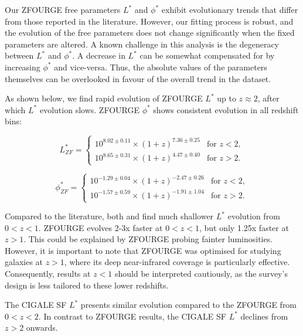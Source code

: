 Our ZFOURGE free parameters $L^{*}$ and $\phi^{*}$ exhibit evolutionary trends that differ from those reported in the literature. However, our fitting process is robust, and the evolution of the free parameters does not change significantly when the fixed parameters are altered. A known challenge in this analysis is the degeneracy between $L^{*}$ and $\phi^{*}$. A decrease in $L^{*}$ can be somewhat compensated for by increasing $\phi^{*}$ and vice-versa. Thus, the absolute values of the parameters themselves can be overlooked in favour of the overall trend in the dataset. 

As shown below, we find rapid evolution of ZFOURGE $L^{*}$ up to $z\approx2$, after which $L^{*}$ evolution slows. ZFOURGE $\phi^{*}$ shows consistent evolution in all redshift bins: 

\begin{equation*}
    L^{*}_{ZF} =
    \begin{cases} 
        10^{8.02 \pm 0.11} \times (1+z)^{7.36 \pm 0.25} & \text{for } z < 2, \\
        10^{8.65 \pm 0.31} \times (1+z)^{4.47 \pm 0.40} & \text{for } z > 2.
    \end{cases}
\end{equation*}

\begin{equation*}
    \phi^{*}_{ZF} =
    \begin{cases} 
        10^{-1.29 \pm 0.04} \times (1+z)^{-2.47 \pm 0.26} & \text{for } z < 2, \\
        10^{-1.57 \pm 0.59} \times (1+z)^{-1.91 \pm 1.04} & \text{for } z > 2.
    \end{cases}
\end{equation*}

Compared to the literature, both \cite{gruppioni_herschel_2013} and \cite{magnelli_deepest_2013} find much shallower $L^{*}$ evolution from $0<z<1$. ZFOURGE evolves 2-3x faster at $0<z<1$, but only 1.25x faster at $z>1$. This could be explained by ZFOURGE probing fainter luminosities. However, it is important to note that ZFOURGE was optimised for studying galaxies at $z>1$, where its deep near-infrared coverage is particularly effective. Consequently, results at $z<1$ should be interpreted cautiously, as the survey's design is less tailored to these lower redshifts. 

The CIGALE SF $L^{*}$ presents similar evolution compared to the ZFOURGE from $0<z<2$. In contrast to ZFOURGE results, the CIGALE SF $L^{*}$ declines from $z>2$ onwards. 

